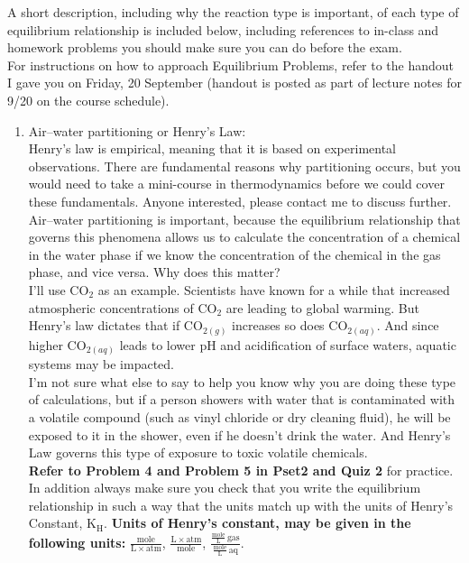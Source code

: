 \documentclass[12pt,letterpaper]{article}
\begin{document}
A short description, including why the reaction type is important, of each type of equilibrium relationship is included below, including references to in-class and homework problems you should make sure you can do before the exam.\\

For instructions on how to approach Equilibrium Problems, refer to the handout I gave you on Friday, 20 September (handout is posted as part of lecture notes for 9/20 on the course schedule). 


\begin{enumerate}
\item Air--water partitioning or Henry's Law:\\

Henry's law is empirical, meaning that it is based on experimental observations.  There are fundamental reasons why partitioning occurs, but you would need to take a mini-course in thermodynamics before we could cover these fundamentals.  Anyone interested, please contact me to discuss further.\\

Air--water partitioning is important, because the equilibrium relationship that governs this phenomena allows us to calculate the concentration of a chemical in the water phase if we know the concentration of the chemical in the gas phase, and vice versa.  Why does this matter?\\

I'll use CO$_2$ as an example.  Scientists have known for a while that increased atmospheric concentrations of CO$_2$ are leading to global warming.  But Henry's law dictates that if CO$_{2(g)}$ increases so does CO$_{2(aq)}$.  And since higher CO$_{2(aq)}$ leads to lower pH and acidification of surface waters, aquatic systems may be impacted.\\

I'm not sure what else to say to help you know why you are doing these type of calculations, but if a person showers with water that is contaminated with a volatile compound (such as vinyl chloride or dry cleaning fluid), he will be exposed to it in the shower, even if he doesn't drink the water.  And Henry's Law governs this type of exposure to toxic volatile chemicals.\\

\textbf{Refer to Problem 4 and Problem 5 in Pset2 and Quiz 2} for practice.\\

In addition always make sure you check that you write the equilibrium relationship in such a way that the units match up with the units of Henry's Constant, K$\mathrm{_H}$.  \textbf{Units of Henry's constant, may be given in the following units:} $\mathrm{\frac{mole}{L\times atm}}$, $\mathrm{\frac{L\times atm}{mole}}$, $\mathrm{\frac{\frac{mole}{L}\, gas}{\frac{mole}{L}\, aq}}$.


\end{enumerate}
\end{document}
